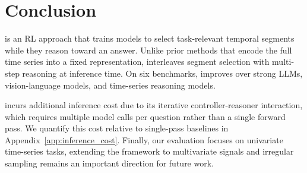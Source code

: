 \section{Conclusion}
\algoname is an RL approach that trains models to select task-relevant temporal segments while they reason toward an answer. Unlike prior methods that encode the full time series into a fixed representation, \algoname interleaves segment selection with multi-step reasoning at inference time. On six benchmarks, \algoname improves over strong LLMs, vision-language models, and  time-series reasoning models.

\algoname incurs additional inference cost due to its iterative controller-reasoner interaction, which requires multiple model calls per question rather than a single forward pass. We quantify this cost relative to single-pass baselines in Appendix~\ref{app:inference_cost}. Finally, our evaluation focuses on univariate time-series tasks, extending the framework to multivariate signals and irregular sampling remains an important direction for future work.